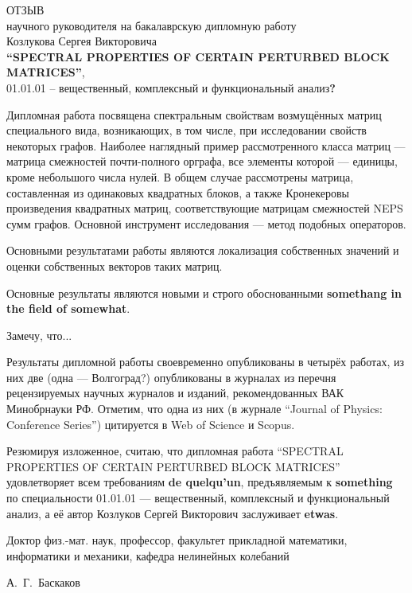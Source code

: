 \documentclass[a4paper]{article}
\begin{document}
\begin{center}
  ОТЗЫВ\\
  научного руководителя на бакалаврскую дипломную работу\\
  Козлукова Сергея Викторовича\\
  \textbf{``SPECTRAL PROPERTIES OF CERTAIN PERTURBED BLOCK MATRICES''},\\
  01.01.01 -- вещественный, комплексный и функциональный анализ\textbf{?}
\end{center}

Дипломная работа посвящена спектральным свойствам возмущённых матриц
специального вида, возникающих, в том числе, при исследовании свойств некоторых
графов. Наиболее наглядный пример рассмотренного класса матриц --- матрица
смежностей почти-полного орграфа,
все элементы которой --- единицы, кроме небольшого числа нулей.
В общем случае рассмотрены матрица, составленная из одинаковых квадратных
блоков, а также Кронекеровы произведения квадратных матриц, соответствующие
матрицам смежностей NEPS сумм графов.
Основной инструмент исследования --- метод подобных операторов.

Основными результатами работы являются локализация собственных значений и оценки
собственных векторов таких матриц.

Основные результаты являются новыми и строго обоснованными
\textbf{somethang in the field of somewhat}.

Замечу, что...

Результаты дипломной работы своевременно опубликованы в четырёх работах, из них
две (одна --- Волгоград?) опубликованы в журналах из перечня рецензируемых
научных журналов и  изданий, рекомендованных ВАК Минобрнауки РФ.
Отметим, что одна из них (в журнале ``Journal of Physics: Conference Series'')
цитируется в Web of Science и Scopus.

Резюмируя изложенное, считаю, что дипломная работа
``SPECTRAL PROPERTIES OF
CERTAIN PERTURBED BLOCK MATRICES''
удовлетворяет всем требованиям \textbf{de quelqu'un}, предъявляемым к
\textbf{something} по специальности 01.01.01 --- вещественный, комплексный и
функциональный анализ, а её автор Козлуков Сергей Викторович заслуживает
\textbf{etwas}.


\vfill
\begin{minipage}{12em}
Доктор физ.-мат. наук, профессор,
факультет прикладной математики, информатики и механики,
кафедра нелинейных колебаний
\end{minipage}
\hfill
А.~Г.~Баскаков
\end{document}
